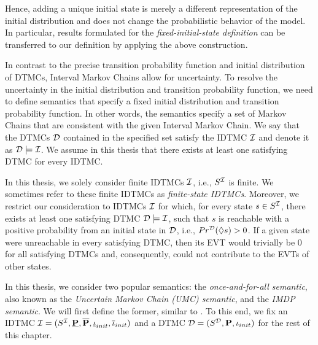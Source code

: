 Hence, adding a unique initial state is merely a different representation of the initial distribution and does not change the probabilistic behavior of the model. In particular, results formulated for the \textit{fixed-initial-state definition} can be transferred to our definition by applying the above construction.

In contrast to the precise transition probability function and initial distribution of DTMCs, Interval Markov Chains allow for uncertainty. 
To resolve the uncertainty in the initial distribution and transition probability function, we need to define semantics that specify a fixed initial distribution and transition probability function. In other words, the semantics specify a set of Markov Chains that are consistent with the given Interval Markov Chain. We say that the DTMCs $\mathcal{D}$ contained in the specified set satisfy the IDTMC $\mathcal{I}$ and denote it as $\mathcal{D} \models \mathcal{I}$. We assume in this thesis that there exists at least one satisfying DTMC for every IDTMC.

\begin{assumption}\label{assmp:finiteness_IDTMCs}
    In this thesis, we solely consider finite IDTMCs $\mathcal{I}$, i.e., $S^{\mathcal{I}}$ is finite. We sometimes refer to these finite IDTMCs as \textit{finite-state IDTMCs}.
    Moreover, we restrict our consideration to IDTMCs $\mathcal{I}$ for which, for every state $s\in S^{\mathcal{I}}$, there exists at least one satisfying DTMC $\mathcal{D} \models \mathcal{I}$, such that $s$ is reachable with a positive probability from an initial state in $\mathcal{D}$, i.e., $Pr^{\mathcal{D}}(\lozenge s) > 0$. If a given state were unreachable in every satisfying DTMC, then its EVT would trivially be $0$ for all satisfying DTMCs and, consequently, could not contribute to the EVTs of other states.
\end{assumption}

In this thesis, we consider two popular semantics: the \textit{once-and-for-all semantic}, also known as the \textit{Uncertain Markov Chain (UMC) semantic}, and the \textit{IMDP semantic}.
We will first define the former, similar to \cite{Semantics_Quant-Analysis,Semantics_Model-Checking_omega-Regular,Semantics_LTL_Model_Checking}. To this end, we fix an IDTMC $\mathcal{I} = (S^{\mathcal{I}},\mathbf{\underline{P}},\mathbf{\overline{P}},\mathbf{\underline{\iota}}_{init},\mathbf{\overline{\iota}}_{init})$ and a DTMC $\mathcal{D} = (S^{\mathcal{D}},\mathbf{P},\iota_{init})$ for the rest of this chapter.

